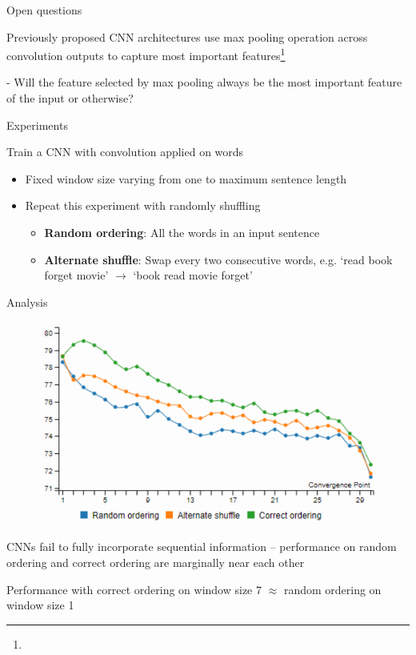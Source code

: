 \documentclass[12pt]{beamer}
\begin{document}
\begin{frame}{Open questions}
	
Previously proposed CNN architectures use max pooling operation across convolution outputs to capture most important features\footnote{}

- Will the feature selected by max pooling always be the most important feature of the input or otherwise?
	
\end{frame}


\begin{frame}{Experiments}
	
Train a CNN with convolution applied on words 

\begin{itemize}
	\item Fixed window size varying from one to maximum sentence length
	\item Repeat this experiment with randomly shuffling
	\begin{itemize}
		\item \textbf{Random ordering}: All the words in an input sentence
		\item \textbf{Alternate shuffle}: Swap every two consecutive words, e.g. `read book forget movie' $\to$ `book read movie forget'
	\end{itemize}
\end{itemize}


\end{frame}


\begin{frame}{Analysis}

\begin{figure}
\includegraphics[width=0.6\linewidth]{img/cnnanalysis1.png}
\end{figure}

CNNs fail to fully incorporate sequential information -- performance on random ordering and correct ordering are marginally near each other

Performance with correct ordering on window size 7 $\approx$ random ordering on window size 1

	
\end{frame}
\end{document}
